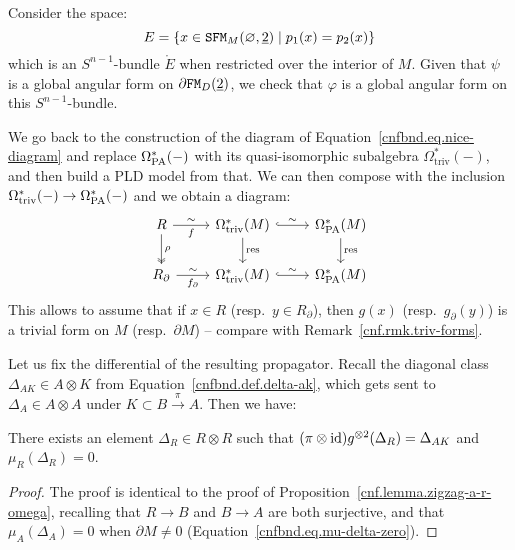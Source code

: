 Consider the space:
\begin{equation}
  E = \{ x \in \mathtt{SFM}_{M}(\varnothing,\underline{2}) \mid p_{1}(x) = p_{2}(x) \}
  \label{cnfbnd.eq.bdl-propagator}
\end{equation}
which is an $S^{n-1}$-bundle $\mathring{E}$ when restricted over the interior of $M$.
Given that $\psi$ is a global angular form on $\partial \mathtt{FM}_{D}(\underline{2})$, we check that $\varphi$ is a global angular form on this $S^{n-1}$-bundle.

\begin{remark}
  \label{cnfbnd.rmk.triv-forms}
  We go back to the construction of the diagram of Equation~\eqref{cnfbnd.eq.nice-diagram} and replace $\Omega_{\mathrm{PA}}^{*}(-)$ with its quasi-isomorphic subalgebra $\Omega^{*}_{\mathrm{triv}}(-)$, and then build a PLD model from that.
  We can then compose with the inclusion $\Omega^{*}_{\mathrm{triv}}(-) \to \Omega_{\mathrm{PA}}^{*}(-)$ and we obtain a diagram:
  \[ \begin{tikzcd}
      R \ar[d, two heads, "\rho"] \ar[r, "\sim", "f" swap] & \Omega^{*}_{\mathrm{triv}}(M) \ar[r, hook, "\sim"] \ar[d, "\text{res}"] & \OmPA^{*}(M) \ar[d, "\text{res}"] \\
      R_{\partial} \ar[r, "\sim", "f_{\partial}" swap] & \Omega^{*}_{\mathrm{triv}}(M) \ar[r, hook, "\sim"] & \OmPA^{*}(M)
    \end{tikzcd} \]
  This allows to assume that if $x \in R$ (resp.\ $y \in R_{\partial}$), then $g(x)$ (resp.\ $g_{\partial}(y)$) is a trivial form on $M$ (resp.\ $\partial M$) -- compare with Remark~\ref{cnf.rmk.triv-forms}.
\end{remark}

Let us fix the differential of the resulting propagator.
Recall the diagonal class $\Delta_{AK} \in A \otimes K$ from Equation~\eqref{cnfbnd.def.delta-ak}, which gets sent to $\Delta_{A} \in A \otimes A$ under $K \subset B \xrightarrow{\pi} A$.
Then we have:

\begin{lemma}
  \label{cnfbnd.lem.delta-r}
  There exists an element $\Delta_{R} \in R \otimes R$ such that $(\pi \otimes \operatorname{id}) g^{\otimes 2}(\Delta_{R}) = \Delta_{AK}$ and $\mu_{R}(\Delta_{R}) = 0$.
\end{lemma}
\begin{proof}
  The proof is identical to the proof of Proposition~\ref{cnf.lemma.zigzag-a-r-omega}, recalling that $R \to B$ and $B \to A$ are both surjective, and that $\mu_{A}(\Delta_{A}) = 0$ when $\partial M \neq 0$ (Equation~\eqref{cnfbnd.eq.mu-delta-zero}).
\end{proof}

